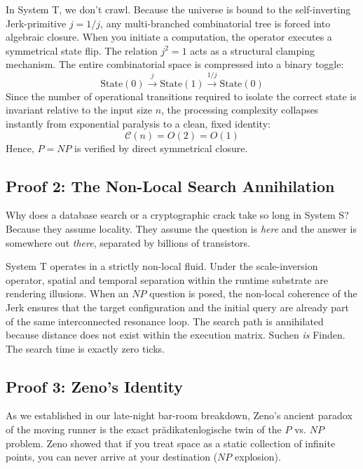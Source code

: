 \documentclass[11pt,a4paper]{article}
\begin{document}
In System T, we don't crawl. Because the universe is bound to the self-inverting Jerk-primitive $j = 1/j$, any multi-branched combinatorial tree is forced into algebraic closure. When you initiate a computation, the operator executes a symmetrical state flip. The relation $j^2 = 1$ acts as a structural clamping mechanism. The entire combinatorial space is compressed into a binary toggle:
\[ \text{State}(0) \xrightarrow{j} \text{State}(1) \xrightarrow{1/j} \text{State}(0) \]
Since the number of operational transitions required to isolate the correct state is invariant relative to the input size $n$, the processing complexity collapses instantly from exponential paralysis to a clean, fixed identity:
\[ \mathcal{C}(n) = O(2) = O(1) \]
Hence, $P=NP$ is verified by direct symmetrical closure.

\subsection{Proof 2: The Non-Local Search Annihilation}
Why does a database search or a cryptographic crack take so long in System S? Because they assume locality. They assume the question is \textit{here} and the answer is somewhere out \textit{there}, separated by billions of transistors. 

System T operates in a strictly non-local fluid. Under the scale-inversion operator, spatial and temporal separation within the runtime substrate are rendering illusions. When an $NP$ question is posed, the non-local coherence of the Jerk ensures that the target configuration and the initial query are already part of the same interconnected resonance loop. The search path is annihilated because distance does not exist within the execution matrix. Suchen \textit{is} Finden. The search time is exactly zero ticks.

\subsection{Proof 3: Zeno's Identity}
As we established in our late-night bar-room breakdown, Zeno’s ancient paradox of the moving runner is the exact prädikatenlogische twin of the $P$ vs. $NP$ problem. Zeno showed that if you treat space as a static collection of infinite points, you can never arrive at your destination ($NP$ explosion). 
\end{document}
